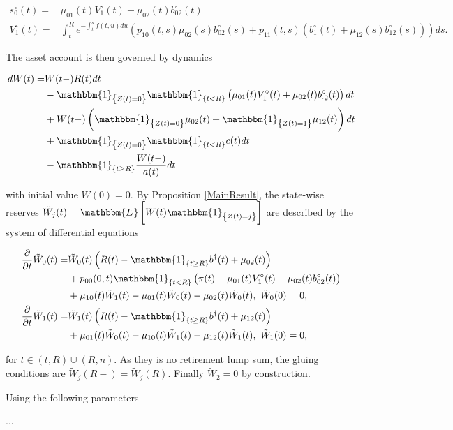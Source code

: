 \documentclass{book}
\newcommand{\1}[1]{\mathbbm{1}_{\left\lbrace #1 \right\rbrace}}
\newcommand{\expec}[1][def]{\mathbbm{E} \left[ #1 \right]}
\theoremstyle{break}
\theoremstyle{remark}
\numberwithin{equation}{section}
\begin{document}
\begin{example}
\begin{align*}
    s_0^\circ(t) =& \mu_{01}(t) V_1^\circ(t) + \mu_{02}(t) b_{02}^\circ(t) \\
    V_1^\circ(t) =& \int_t^R e^{-\int_t^s f(t,u)du} \left( p_{10}(t,s) \mu_{02}(s) b_{02}^\circ(s) + p_{11}(t,s) \left( b_1^\circ(t) + \mu_{12}(s) b_{12}^\circ(s) \right) \right) ds.
\end{align*}

The asset account is then governed by dynamics

\begin{align*}
    dW(t) =& W(t-) R(t) dt \\
    &- \1{Z(t)=0} \1{t<R} \left( \mu_{01}(t) V_1^\circ(t) + \mu_{02}(t) b_{\cdot 2}^\circ(t) \right) dt \\
    &+ W(t-) \left( \1{Z(t)=0} \mu_{02}(t) + \1{Z(t)=1} \mu_{12}(t) \right)dt \\
    &+ \1{Z(t)=0} \1{t<R} c(t)dt \\
    &- \1{t \geq R} \frac{W(t-)}{a(t)} dt
\end{align*}

with initial value $W(0)=0$. By Proposition \ref{MainResult}, the state-wise reserves $\tilde{W}_j(t)=\expec[W(t) \1{Z(t)=j}]$ are described by the system of differential equations

\begin{align*}
    \frac{\partial}{\partial t} \tilde{W}_0(t) =& \tilde{W}_0(t) \left( R(t) - \1{t \geq R} b^\dagger(t) + \mu_{02}(t) \right) \\
    &+ p_{00}(0,t) \1{t<R} \left(\pi(t) - \mu_{01}(t) V_1^\circ(t) - \mu_{02}(t) b_{02}^\circ(t) \right) \\
    &+ \mu_{10}(t) \tilde{W}_1(t) - \mu_{01}(t) \tilde{W}_0(t) - \mu_{02}(t) \tilde{W}_0(t), \, \, \tilde{W}_0(0) = 0, \\
    \frac{\partial}{\partial t} \tilde{W}_1(t) =& \tilde{W}_1(t) \left( R(t) - \1{t \geq R} b^\dagger(t) + \mu_{12}(t) \right) \\
    &+ \mu_{01}(t) \tilde{W}_0(t) - \mu_{10}(t) \tilde{W}_1(t) - \mu_{12}(t) \tilde{W}_1(t), \, \, \tilde{W}_1(0) = 0,
\end{align*}

for $t \in (t,R) \cup (R,n)$. As they is no retirement lump sum, the gluing conditions are $\tilde{W}_j(R-) = \tilde{W}_j(R)$. Finally $\tilde{W}_2=0$ by construction.

Using the following parameters

...


\end{example}
\end{document}
